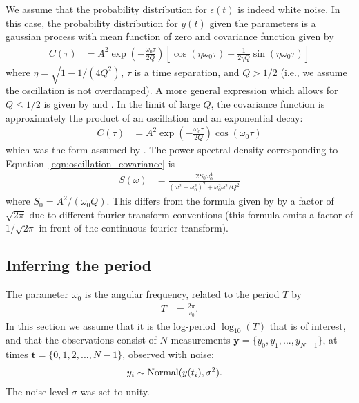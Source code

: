 \documentclass[a4paper, 12pt]{article}
\begin{document}
We assume that the probability distribution for $\epsilon(t)$ is indeed white
noise. In this case, the probability distribution for $y(t)$ given the
parameters is a gaussian process with mean function of zero and
covariance function given by
\begin{align}
C(\tau) &= A^2\exp\left(-\frac{\omega_0\tau}{2Q}\right)
            \left[\cos(\eta\omega_0\tau)
                + \frac{1}{2\eta Q}\sin(\eta\omega_0\tau)\right]
    \label{eqn:oscillation_covariance}
\end{align}
where $\eta = \sqrt{1 - 1/(4Q^2)}$, $\tau$ is a time separation,
and $Q > 1/2$ (i.e., we assume the oscillation is not overdamped).
A more general expression which allows for $Q \leq 1/2$
is given by \citet{anderson} and \citet{celerite}.
In the limit of large $Q$, the covariance function is approximately
the product of an oscillation and an exponential decay:
\begin{align}
C(\tau) &= A^2\exp\left(-\frac{\omega_0\tau}{2Q}\right)\cos(\omega_0\tau)
\end{align}
which was the form assumed by \citet{brewer_stello}.
The power spectral density corresponding to
Equation~\ref{eqn:oscillation_covariance} is
\begin{align}
S(\omega) &= \frac{2S_0\omega_0^4}
                  {(\omega^2 - \omega_0^2)^2 + \omega_0^2\omega^2/Q^2}
\end{align}
where $S_0 = A^2/(\omega_0Q)$. This differs from the formula given by
\citet{celerite} by a factor of $\sqrt{2\pi}$ due to different fourier
transform conventions (this formula omits a factor of $1/\sqrt{2\pi}$
in front of the continuous fourier transform).


\subsection{Inferring the period}
The parameter $\omega_0$ is the angular frequency, related to the period
$T$ by
\begin{align}
T &= \frac{2\pi}{\omega_0}.
\end{align}
In this section we assume that it is the log-period $\log_{10}(T)$ that is
of interest, and that the observations consist of $N$ measurements
$\boldsymbol{y} = \{y_0, y_1, ..., y_{N-1}\}$,
at times $\boldsymbol{t} = \{0,1,2,...,N-1\}$, observed with noise:
\begin{align}
y_i &\sim \textnormal{Normal}(y(t_i), \sigma^2).
\end{align}
The noise level $\sigma$ was set to unity.
\end{document}
